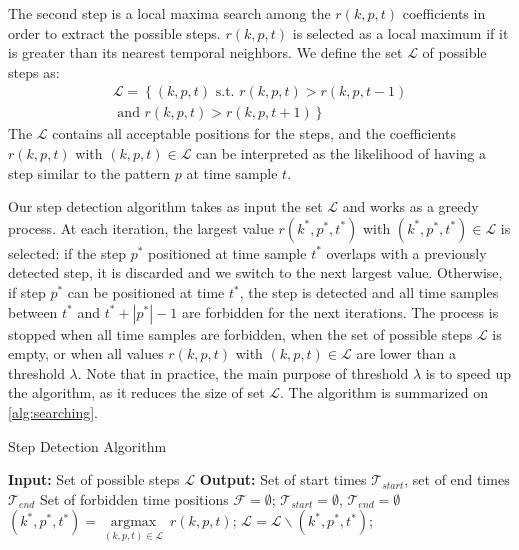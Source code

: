 \documentclass[../thesis.tex]{subfiles}
\begin{document}
The second step is a local maxima search among the $r(k,p,t)$ coefficients in order to extract the possible steps. $r(k,p,t)$ is selected as a local maximum if it is greater than its nearest temporal neighbors. We define the set $\mathcal{L}$ of possible steps as:
\begin{equation}
\begin{split}
 \mathcal{L} = \left\lbrace (k,p,t)\mbox{ s.t. } r(k,p,t) > r(k,p,t-1)\right. \\ \left. \mbox{ and } r(k,p,t) > r(k,p,t+1)\right\rbrace 
\end{split}
\end{equation}
The $\mathcal{L}$ contains all acceptable positions for the steps, and the coefficients $r(k,p,t)$ with $(k,p,t)\in\mathcal{L}$ can be interpreted as the likelihood of having a step similar to the pattern $p$ at time sample $t$. 

Our step detection algorithm takes as input the set $\mathcal{L}$ and works as a greedy process. At each iteration,  the largest value $r(k^*,p^*, t^*)$ with $(k^*,p^*, t^*)\in\mathcal{L}$ is selected: if the step $p^*$ positioned at time sample $t^*$ overlaps with a previously detected step, it is discarded and we switch to the next largest value. Otherwise, if step $p^*$ can be positioned at time $t^*$, the step is detected and all time samples between $t^*$ and $t^*+|p^*|-1$ are forbidden for the next iterations. The process is stopped when all time samples are forbidden, when the set of possible steps $\mathcal{L}$ is empty, or when all values $r(k,p,t)$ with $(k,p,t)\in\mathcal{L}$  are lower than a threshold $\lambda$. Note that in practice, the main purpose of threshold $\lambda$ is to speed up the algorithm, as it reduces the size of set $\mathcal{L}$. The algorithm is summarized on \autoref{alg:searching}. 


\begin{algorithm}[th]
 \caption{Step Detection Algorithm}
 \label{alg:searching}
 \begin{algorithmic}[1]
 \STATE \textbf{Input: }{Set of possible steps $\mathcal{L}$}
 \STATE \textbf{Output: }{Set of start times $\mathcal{T}_{start}$, set of end times $\mathcal{T}_{end}$}
  \STATE Set of forbidden time positions $\mathcal{F}= \emptyset$;
  \STATE $\mathcal{T}_{start}= \emptyset$,  $\mathcal{T}_{end}= \emptyset$
 \STATE $(k^*,p^*, t^*) = \underset{(k, p, t)\in\mathcal{L}}{\operatorname{argmax}}\ r(k,p,t)$;
$\mathcal{L} = \mathcal{L} \backslash (k^*,p^*, t^*)$;
\ENDIF
\ENDWHILE

\end{algorithmic}
\end{algorithm}
\end{document}
